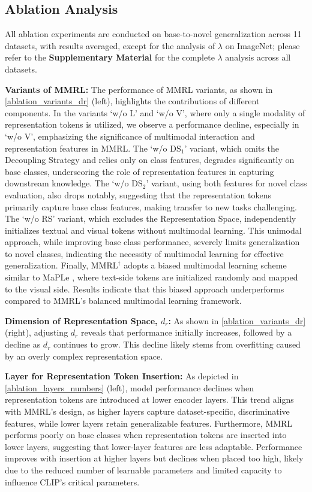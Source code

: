 \subsection{Ablation Analysis}
All ablation experiments are conducted on base-to-novel generalization across 11 datasets, with results averaged, except for the analysis of $\lambda$ on ImageNet; please refer to the \textbf{Supplementary Material} for the complete $\lambda$ analysis across all datasets.

\noindent \textbf{Variants of MMRL:} The performance of MMRL variants, as shown in \cref{ablation_variants_dr} (left), highlights the contributions of different components. In the variants `w/o L' and `w/o V', where only a single modality of representation tokens is utilized, we observe a performance decline, especially in `w/o V', emphasizing the significance of multimodal interaction and representation features in MMRL. The `w/o $\text{DS}_1$' variant, which omits the Decoupling Strategy and relies only on class features, degrades significantly on base classes, underscoring the role of representation features in capturing downstream knowledge. The `w/o $\text{DS}_2$' variant, using both features for novel class evaluation, also drops notably, suggesting that the representation tokens primarily capture base class features, making transfer to new tasks challenging. The `w/o RS' variant, which excludes the Representation Space, independently initializes textual and visual tokens without multimodal learning. This unimodal approach, while improving base class performance, severely limits generalization to novel classes, indicating the necessity of multimodal learning for effective generalization. Finally, $\text{MMRL}^\dagger$ adopts a biased multimodal learning scheme similar to MaPLe \cite{maple}, where text-side tokens are initialized randomly and mapped to the visual side. Results indicate that this biased approach underperforms compared to MMRL's balanced multimodal learning framework.

\noindent \textbf{Dimension of Representation Space, $d_r$:} As shown in \cref{ablation_variants_dr} (right), adjusting $d_r$ reveals that performance initially increases, followed by a decline as $d_r$ continues to grow. This decline likely stems from overfitting caused by an overly complex representation space.

\noindent \textbf{Layer for Representation Token Insertion:} As depicted in \cref{ablation_layers_numbers} (left), model performance declines when representation tokens are introduced at lower encoder layers. This trend aligns with MMRL's design, as higher layers capture dataset-specific, discriminative features, while lower layers retain generalizable features. Furthermore, MMRL performs poorly on base classes when representation tokens are inserted into lower layers, suggesting that lower-layer features are less adaptable. Performance improves with insertion at higher layers but declines when placed too high, likely due to the reduced number of learnable parameters and limited capacity to influence CLIP's critical parameters.


